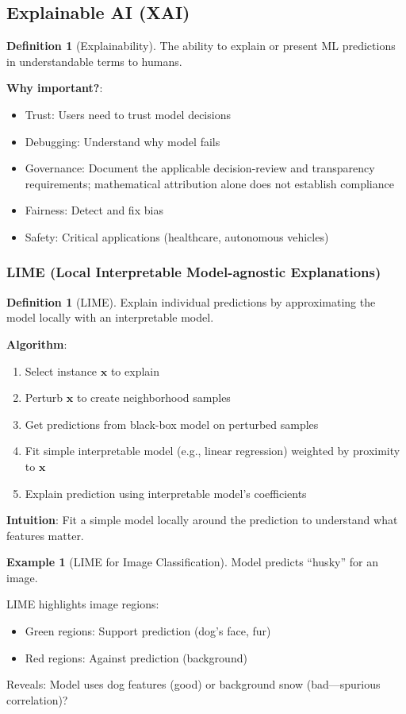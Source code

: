 \documentclass[11pt,twoside]{article}
\numberwithin{equation}{section}
\newcommand{\vect}[1]{\bm{#1}}
\theoremstyle{plain}
\theoremstyle{definition}
\newtheorem{definition}[theorem]{Definition}
\newtheorem{example}[theorem]{Example}
\theoremstyle{remark}
\begin{document}
\subsection{Explainable AI (XAI)}

\begin{definition}[Explainability]
The ability to explain or present ML predictions in understandable terms to humans.

\textbf{Why important?}:
\begin{itemize}
\item Trust: Users need to trust model decisions
\item Debugging: Understand why model fails
\item Governance: Document the applicable decision-review and transparency requirements; mathematical attribution alone does not establish compliance
\item Fairness: Detect and fix bias
\item Safety: Critical applications (healthcare, autonomous vehicles)
\end{itemize}
\end{definition}

\subsubsection{LIME (Local Interpretable Model-agnostic Explanations)}

\begin{definition}[LIME]
Explain individual predictions by approximating the model locally with an interpretable model.

\textbf{Algorithm}:
\begin{enumerate}
\item Select instance $\vect{x}$ to explain
\item Perturb $\vect{x}$ to create neighborhood samples
\item Get predictions from black-box model on perturbed samples
\item Fit simple interpretable model (e.g., linear regression) weighted by proximity to $\vect{x}$
\item Explain prediction using interpretable model's coefficients
\end{enumerate}

\textbf{Intuition}: Fit a simple model locally around the prediction to understand what features matter.
\end{definition}

\begin{example}[LIME for Image Classification]
Model predicts ``husky'' for an image.

LIME highlights image regions:
\begin{itemize}
\item Green regions: Support prediction (dog's face, fur)
\item Red regions: Against prediction (background)
\end{itemize}

Reveals: Model uses dog features (good) or background snow (bad---spurious correlation)?
\end{example}
\end{document}
